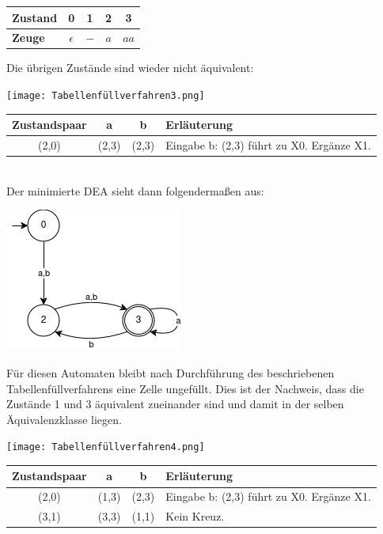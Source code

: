 \begin{teile}
		\begin{tabular}{l|c|c|c|c}
			\textbf{Zustand} & \textbf{0} & \textbf{1} & \textbf{2} & \textbf{3} \\
			\hline
			\textbf{Zeuge} & $\epsilon$ & $-$ & $a$ & $aa$ \\
		\end{tabular}

		Die übrigen Zustände sind wieder nicht äquivalent:
	
	\texttt{[image: Tabellenfüllverfahren3.png]}	
	
	\begin{tabular}{c|c|c|l}
		\textbf{Zustandspaar} & \textbf{a} & \textbf{b} & \textbf{Erläuterung} \\
		\hline
		(2,0)                 & (2,3)      & (2,3)      & Eingabe b: (2,3) führt zu X0. Ergänze X1. \\
	\end{tabular}\\
	
	Der minimierte DEA sieht dann folgendermaßen aus:
	
	\includegraphics[scale=0.75]{MiniDEA2} 

	\item
		Für diesen Automaten bleibt nach Durchführung des beschriebenen Tabellenfüllverfahrens eine Zelle ungefüllt. Dies ist der Nachweis, dass die Zustände 1 und 3 äquivalent zueinander sind und damit in der selben Äquivalenzklasse liegen.

	\texttt{[image: Tabellenfüllverfahren4.png]}		
	
	\begin{tabular}{c|c|c|l}
		\textbf{Zustandspaar} & \textbf{a} & \textbf{b} & \textbf{Erläuterung} \\
		\hline
		(2,0)                 & (1,3)      & (2,3)      & Eingabe b: (2,3) führt zu X0. Ergänze X1. \\
		\hline
		(3,1)                 & (3,3)      & (1,1)      & Kein Kreuz. \\
	\end{tabular}


\end{teile}
